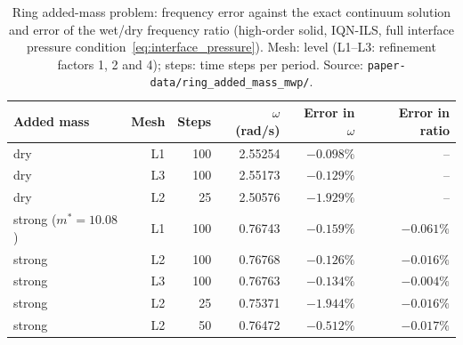 \begin{table}[htbp]
	\centering
	\small
	\setlength{\tabcolsep}{5pt}
	\caption{Ring added-mass problem: frequency error against the exact continuum solution and error of the wet/dry frequency ratio (high-order solid, IQN-ILS, full interface pressure condition~\eqref{eq:interface_pressure}). Mesh: level (L1--L3: refinement factors 1, 2 and 4); steps: time steps per period. Source: \texttt{paper-data/ring\_added\_mass\_mwp/}.}
	\label{tab:ring}
	\begin{tabular}{lrrrrr}
		\toprule
		Added mass & Mesh & Steps & $\omega$ (rad/s) & Error in $\omega$ & Error in ratio \\
		\midrule
		dry & L1 & 100 & 2.55254 & $-0.098\%$ & -- \\
		dry & L3 & 100 & 2.55173 & $-0.129\%$ & -- \\
		dry & L2 & 25 & 2.50576 & $-1.929\%$ & -- \\
		strong ($m^*=10.08$) & L1 & 100 & 0.76743 & $-0.159\%$ & $-0.061\%$ \\
		strong & L2 & 100 & 0.76768 & $-0.126\%$ & $-0.016\%$ \\
		strong & L3 & 100 & 0.76763 & $-0.134\%$ & $-0.004\%$ \\
		strong & L2 & 25 & 0.75371 & $-1.944\%$ & $-0.016\%$ \\
		strong & L2 & 50 & 0.76472 & $-0.512\%$ & $-0.017\%$ \\
		\bottomrule
	\end{tabular}
\end{table}

